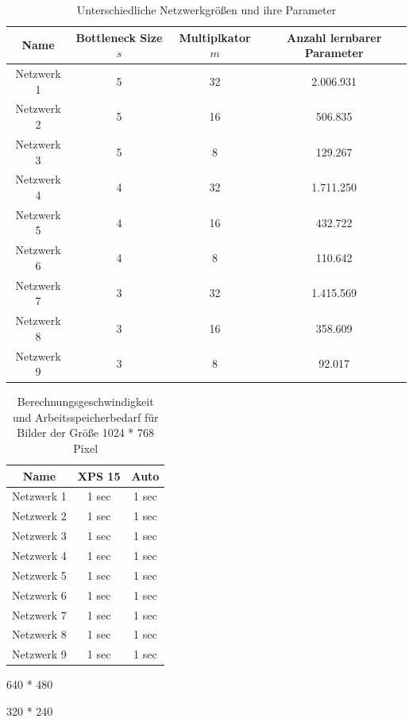 \begin{table}[H]
    \centering
    \begin{tabular}{ |c|c|c|c| }
        \hline
        \textbf{Name} & \textbf{Bottleneck Size $ s $} & \textbf{Multiplkator $ m $} & \textbf{Anzahl lernbarer Parameter} \\ \hline
        Netzwerk 1 & 5 & 32 & 2.006.931 \\ \hline
        Netzwerk 2 & 5 & 16 & 506.835 \\ \hline
        Netzwerk 3 & 5 & 8  & 129.267 \\ \hline

        Netzwerk 4 & 4 & 32 & 1.711.250 \\ \hline
        Netzwerk 5 & 4 & 16 & 432.722 \\ \hline
        Netzwerk 6 & 4 & 8  & 110.642 \\ \hline

        Netzwerk 7 & 3 & 32 & 1.415.569 \\ \hline
        Netzwerk 8 & 3 & 16 & 358.609 \\ \hline
        Netzwerk 9 & 3 & 8  & 92.017 \\ \hline
    \end{tabular}
    \caption{Unterschiedliche Netzwerkgrößen und ihre Parameter}
    \label{tab:networks}
\end{table}



\begin{table}[h]

    
    \centering
    \begin{tabular}{ |c|c|c| }
        \hline
        \textbf{Name} & \textbf{XPS 15} & \textbf{Auto}   \\ \hline
        Netzwerk 1 & 1 sec & 1 sec \\ \hline
        Netzwerk 2 & 1 sec & 1 sec \\ \hline
        Netzwerk 3  & 1 sec & 1 sec \\ \hline

        Netzwerk 4 & 1 sec & 1 sec \\ \hline
        Netzwerk 5 & 1 sec & 1 sec \\ \hline
        Netzwerk 6  & 1 sec & 1 sec \\ \hline

        Netzwerk 7 & 1 sec & 1 sec \\ \hline
        Netzwerk 8 & 1 sec & 1 sec \\ \hline
        Netzwerk 9 & 1 sec & 1 sec \\ \hline
    \end{tabular}
    \caption{Berechnungsgeschwindigkeit und Arbeitsspeicherbedarf für Bilder der Größe 1024 * 768 Pixel}
    \label{tab:1024x768}
\end{table}

640 * 480


320 * 240

